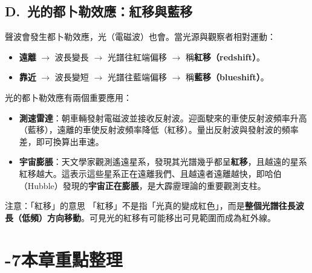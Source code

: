 \documentclass[11pt]{article}
\begin{document}
\subsection*{\sffamily D.\ 光的都卜勒效應：紅移與藍移}

聲波會發生都卜勒效應，光（電磁波）也會。當光源與觀察者相對運動：

\begin{itemize}\setlength{\itemsep}{1pt}
\item \textbf{遠離} $\rightarrow$ 波長變長 $\rightarrow$ 光譜往紅端偏移 $\rightarrow$ 稱\textbf{紅移（redshift）}。
\item \textbf{靠近} $\rightarrow$ 波長變短 $\rightarrow$ 光譜往藍端偏移 $\rightarrow$ 稱\textbf{藍移（blueshift）}。
\end{itemize}

光的都卜勒效應有兩個重要應用：

\begin{itemize}\setlength{\itemsep}{1pt}
\item \textbf{測速雷達}：朝車輛發射電磁波並接收反射波。迎面駛來的車使反射波頻率升高（藍移），遠離的車使反射波頻率降低（紅移）。量出反射波與發射波的頻率差，即可換算出車速。
\item \textbf{宇宙膨脹}：天文學家觀測遙遠星系，發現其光譜幾乎都呈\textbf{紅移}，且越遠的星系紅移越大。這表示這些星系正在遠離我們、且越遠者遠離越快，即哈伯（Hubble）發現的\textbf{宇宙正在膨脹}，是大霹靂理論的重要觀測支柱。
\end{itemize}

\begin{補充框}{注意：「紅移」的意思}
「紅移」不是指「光真的變成紅色」，而是\textbf{整個光譜往長波長（低頻）方向移動}。可見光的紅移有可能移出可見範圍而成為紅外線。
\end{補充框}

\section*{-7\quad 本章重點整理}
\end{document}
